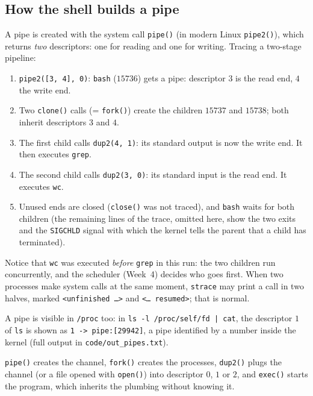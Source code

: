 \documentclass[11pt,a4paper]{article}
\newcommand{\cmd}[1]{\texttt{#1}}
\begin{document}
\subsection{How the shell builds a pipe}

A pipe is created with the system call \cmd{pipe()} (in modern Linux \cmd{pipe2()}), which returns \emph{two} descriptors: one for reading and one for writing. Tracing a two-stage pipeline:



\begin{enumerate}[leftmargin=1.4em]
  \item \cmd{pipe2([3, 4], 0)}: \cmd{bash} ($15736$) gets a pipe: descriptor $3$ is the read end, $4$ the write end.
  \item Two \cmd{clone()} calls (= \cmd{fork()}) create the children $15737$ and $15738$; both inherit descriptors $3$ and $4$.
  \item The first child calls \cmd{dup2(4, 1)}: its standard output is now the write end. It then executes \cmd{grep}.
  \item The second child calls \cmd{dup2(3, 0)}: its standard input is the read end. It executes \cmd{wc}.
  \item Unused ends are closed (\cmd{close()} was not traced), and \cmd{bash} waits for both children (the remaining lines of the trace, omitted here, show the two exits and the \texttt{SIGCHLD} signal with which the kernel tells the parent that a child has terminated).
\end{enumerate}
Notice that \cmd{wc} was executed \emph{before} \cmd{grep} in this run: the two children run concurrently, and the scheduler (Week~4) decides who goes first. When two processes make system calls at the same moment, \cmd{strace} may print a call in two halves, marked \texttt{<unfinished \dots>} and \texttt{<\dots{} resumed>}; that is normal.

A pipe is visible in \texttt{/proc} too: in \cmd{ls -l /proc/self/fd | cat}, the descriptor $1$ of \cmd{ls} is shown as \texttt{1 -> pipe:[29942]}, a pipe identified by a number inside the kernel (full output in \texttt{code/out\_pipes.txt}).

\begin{keyidea}
\cmd{pipe()} creates the channel, \cmd{fork()} creates the processes, \cmd{dup2()} plugs the channel (or a file opened with \cmd{open()}) into descriptor $0$, $1$ or $2$, and \cmd{exec()} starts the program, which inherits the plumbing without knowing it.
\end{keyidea}
\end{document}
